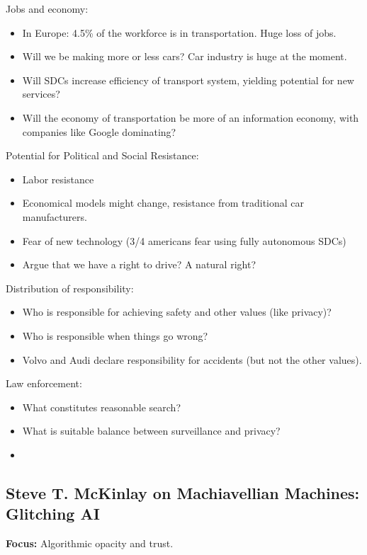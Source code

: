 Jobs and economy:
\begin{itemize}
    \item In Europe: 4.5\% of the workforce is in transportation. Huge loss of jobs.
    \item Will we be making more or less cars? Car industry is huge at the moment.
    \item Will SDCs increase efficiency of transport system, yielding potential for new services?
    \item Will the economy of transportation be more of an information economy, with companies like Google dominating?
\end{itemize}

Potential for Political and Social Resistance:
\begin{itemize}
    \item Labor resistance
    \item Economical models might change, resistance from traditional car manufacturers.
    \item Fear of new technology (3/4 americans fear using fully autonomous SDCs)
    \item Argue that we have a right to drive? A natural right?
\end{itemize}

Distribution of responsibility:
\begin{itemize}
    \item Who is responsible for achieving safety and other values (like privacy)?
    \item Who is responsible when things go wrong?
    \item Volvo and Audi declare responsibility for accidents (but not the other values).
\end{itemize}

Law enforcement:
\begin{itemize}
    \item What constitutes reasonable search?
    \item What is suitable balance between surveillance and privacy?
    \item 
\end{itemize}


\subsection{Steve T. McKinlay on Machiavellian Machines: Glitching AI}

{\bf Focus:} Algorithmic opacity and trust. \\

